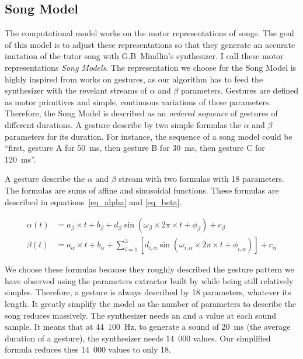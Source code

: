 \documentclass{report}
\begin{document}
\subsection{Song Model}\label{song-model}

The computational model works on the motor representations of songs. The goal of
this model is to adjust these representations so that they generate an accurate
imitation of the tutor song with G.B~Mindlin's synthesizer. I call these motor
representations \emph{Song Models}. The representation we choose for the Song
Model is highly inspired from \textcite{amador_elemental_2013} works on
gestures, as our algorithm has to feed the synthesizer with the revelant streams
of \(\alpha\) and \(\beta\) parameters. Gestures are defined as motor primitives
and simple, continuous variations of these parameters. Therefore, the Song Model
is described as an \emph{ordered sequence} of gestures of different durations. A
gesture describe by two simple formulas the \(\alpha\) and \(\beta\) parameters
for its duration. For instance, the sequence of a song model could be ``first, gesture A for 50~ms, then gesture B for 30~ms, then gesture C for 120~ms''.

A gesture describe the \(\alpha\) and \(\beta\) stream with two formulas with 18
parameters. The formulas are sums of affine and sinusoidal functions. These formulas are described in equations~\ref{eq_alpha} and \ref{eq_beta}.

\begin{align}
  \alpha(t) &= a_\beta \times t + b_\beta + d_\beta \sin(\omega_\beta \times 2\pi \times t + \phi_\beta) + c_\beta \label{eq_alpha} \\
  \beta(t) &= a_\alpha \times t + b_\alpha
          + \sum_{i=1}^{3} \left[ d_{i, \alpha} \sin(\omega_{i, \alpha} \times 2\pi \times t
          + \phi_{i, \alpha}) \right] + c_\alpha \label{eq_beta}
\end{align}

We choose these formulas because they roughly described the gesture pattern we
have observed using the parameters extractor built by
\textcite{boari_automatic_2015} while being still relatively simples. Therefore,
a gesture is always described by 18 parameters, whatever its length. It greatly
simplify the model as the number of parameters to describe the song reduces
massively. The synthesizer needs an \alpha and a \beta value at each sound
sample. It means that at 44~100~Hz, to generate a sound of 20~ms (the average
duration of a gesture), the synthesizer needs 14~000 values. Our simplified
formula reduces thes 14~000 values to only 18.
\end{document}

